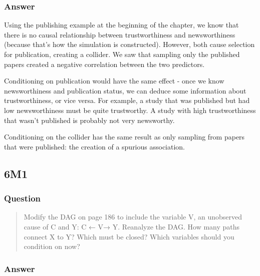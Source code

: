 \documentclass[
]{book}
\begin{document}
\hypertarget{answer-51}{%
\subsubsection*{Answer}\label{answer-51}}

Using the publishing example at the beginning of the chapter, we know that there is no causal relationship between trustworthiness and newsworthiness (because that's how the simulation is constructed). However, both cause selection for publication, creating a collider. We saw that sampling only the published papers created a negative correlation between the two predictors.

Conditioning on publication would have the same effect - once we know newsworthiness and publication status, we can deduce some information about trustworthiness, or vice versa. For example, a study that was published but had low newsworthiness must be quite trustworthy. A study with high trustworthiness that wasn't published is probably not very newsworthy.

Conditioning on the collider has the same result as only sampling from papers that were published: the creation of a spurious association.

\hypertarget{m1-3}{%
\subsection*{6M1}\label{m1-3}}

\hypertarget{question-52}{%
\subsubsection*{Question}\label{question-52}}

\begin{quote}
Modify the DAG on page 186 to include the variable V, an unobserved cause of C and Y: C ← V→ Y. Reanalyze the DAG. How many paths connect X to Y? Which must be closed? Which variables should you condition on now?
\end{quote}

\hypertarget{answer-52}{%
\subsubsection*{Answer}\label{answer-52}}
\end{document}
